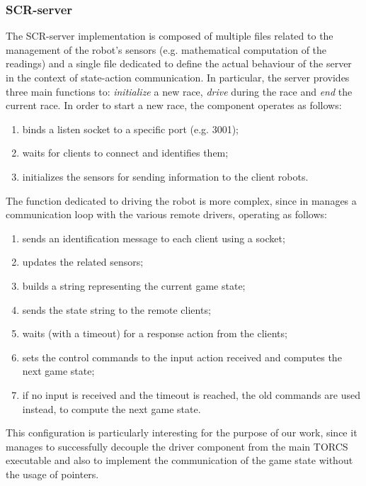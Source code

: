 \subsubsection{SCR-server}
The SCR-server implementation is composed of multiple files related to the management of the robot's sensors (e.g. mathematical computation of the readings) and a single file dedicated to define the actual behaviour of the server in the context of state-action communication. In particular, the server provides three main functions to: \textit{initialize} a new race, \textit{drive} during the race and \textit{end} the current race. In order to start a new race, the component operates as follows:
\begin{enumerate}
	\item binds a listen socket to a specific port (e.g. 3001);
	\item waits for clients to connect and identifies them;
	\item initializes the sensors for sending information to the client robots.
\end{enumerate}
The function dedicated to driving the robot is more complex, since in manages a communication loop with the various remote drivers, operating as follows:
\begin{enumerate}
	\item sends an identification message to each client using a socket;
	\item updates the related sensors;
	\item builds a string representing the current game state;
	\item sends the state string to the remote clients;
	\item waits (with a timeout) for a response action from the clients;
	\item sets the control commands to the input action received and computes the next game state;
	\item if no input is received and the timeout is reached, the old commands are used instead, to compute the next game state.
\end{enumerate}
This configuration is particularly interesting for the purpose of our work, since it manages to successfully decouple the driver component from the main TORCS executable and also to implement the communication of the game state without the usage of pointers.

